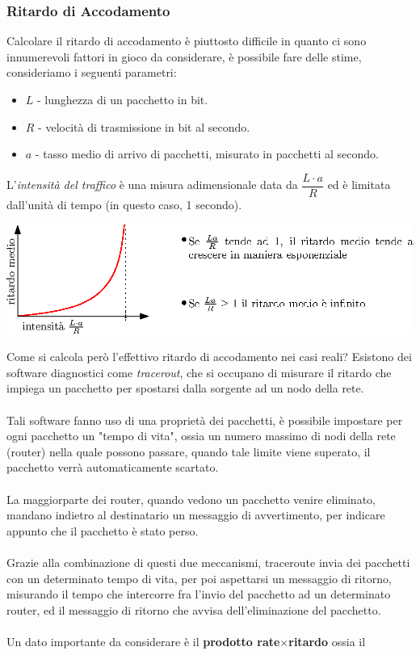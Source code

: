 \documentclass[12pt, letterpaper]{article}
\newcommand{\acc}{\\\hphantom{}\\}
\begin{document}
\subsubsection{Ritardo di Accodamento}
Calcolare il ritardo di accodamento è piuttosto difficile in quanto ci sono innumerevoli fattori in gioco da
considerare, è possibile fare delle stime, consideriamo i seguenti parametri:\begin{itemize}
    \item $L$ - lunghezza di un pacchetto in bit.
    \item $R$ - velocità di trasmissione in bit al secondo.
    \item $a$ - tasso medio di arrivo di pacchetti, misurato in pacchetti al secondo.
\end{itemize}
L'\textit{intensità del traffico} è una misura adimensionale data da $\dfrac{L\cdot a}{R}$ ed è limitata
dall'unità di tempo (in questo caso, 1 secondo).\begin{center}
    \includegraphics[width=\textwidth ]{images/traffico.eps}
\end{center}
Come si calcola però l'effettivo ritardo di accodamento nei casi reali? Esistono dei software
diagnostici come \textit{tracerout}, che si occupano di misurare il ritardo che impiega un pacchetto
per spostarsi dalla sorgente ad un nodo della rete. \acc Tali software fanno uso di una proprietà dei pacchetti,
è possibile impostare per ogni pacchetto un "tempo di vita", ossia un numero massimo di nodi della rete (router)
nella quale possono passare, quando tale limite viene superato, il pacchetto verrà automaticamente scartato.\acc
La maggiorparte dei router, quando vedono un pacchetto venire eliminato, mandano indietro al destinatario un messaggio di
avvertimento, per indicare appunto che il pacchetto è stato perso.\acc Grazie alla combinazione di questi due meccanismi,
traceroute invia dei pacchetti con un determinato tempo di vita, per poi aspettarsi un messaggio di ritorno, misurando il
tempo che intercorre fra l'invio del pacchetto ad un determinato router, ed il messaggio di ritorno che avvisa dell'eliminazione
del pacchetto.\acc
Un dato importante da considerare è il \textbf{prodotto rate$\times$ritardo} ossia il
\end{document}

